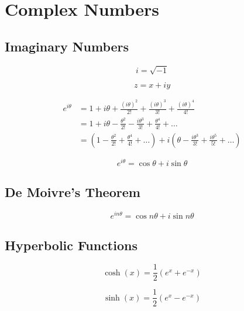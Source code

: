 \chapter{Complex Numbers}

\section{Imaginary Numbers}
\begin{equation*}
    i = \sqrt{-1}
\end{equation*}

\begin{equation*}
    z = x + iy
\end{equation*}

\begin{align*}
    e^{i\theta} &= 1 + i\theta + \frac{(i\theta)^{2}}{2!} + \frac{(i\theta)^{3}}{3!} + \frac{(i\theta)^{4}}{4!}\\
    &= 1 + i\theta - \frac{\theta^{2}}{2!} - \frac{i\theta^{3}}{3!} + \frac{\theta^{4}}{4!} + \dots\\
    &= \left(1 - \frac{\theta^{2}}{2!} + \frac{\theta^{4}}{4!} + \dots\right) + i\left(\theta - \frac{i\theta^{3}}{3!} + \frac{i\theta^{5}}{5!} + \dots\right)
\end{align*}

\begin{equation*}
    e^{i\theta} = \cos\theta + i\sin\theta
\end{equation*}

\section{De Moivre's Theorem}

\begin{equation*}
    e^{in\theta} = \cos n\theta + i \sin n\theta
\end{equation*}

\section{Hyperbolic Functions}

\begin{equation*}
    \cosh(x) = \frac{1}{2}(e^x + e^{-x})
\end{equation*}

\begin{equation*}
    \sinh(x) = \frac{1}{2}(e^x - e^{-x})
\end{equation*}